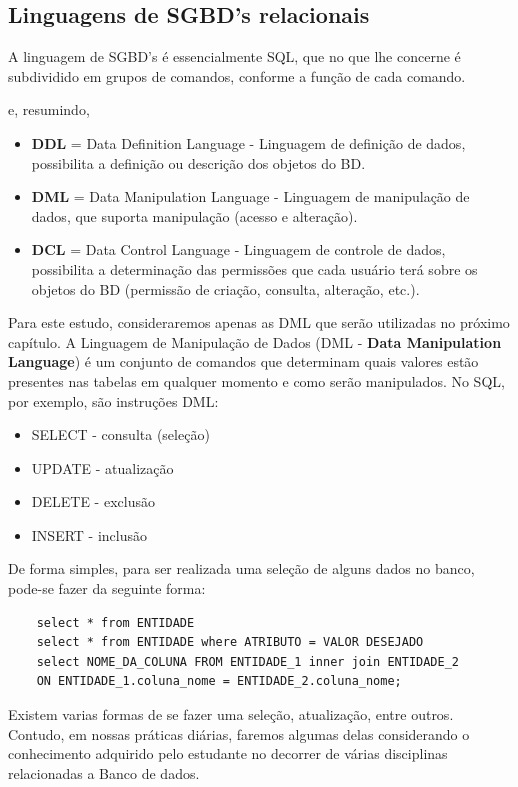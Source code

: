 \subsection{Linguagens de SGBD’s relacionais} 

A linguagem de SGBD's é essencialmente SQL, que no que lhe concerne é subdividido em grupos de comandos, conforme a função de cada comando.

e, resumindo,

\begin{itemize}
	\item \textbf{DDL} = Data Definition Language - Linguagem de definição de dados, possibilita a definição ou descrição dos objetos do BD.
	\item \textbf{DML} = Data Manipulation Language - Linguagem de manipulação de dados, que suporta manipulação (acesso e alteração).
	\item \textbf{DCL} = Data Control Language - Linguagem de controle de dados, possibilita a determinação das permissões que cada usuário terá sobre os objetos do BD (permissão de criação, consulta, alteração, etc.).
\end{itemize}

Para este estudo, consideraremos apenas as DML que serão utilizadas no próximo capítulo. A Linguagem de Manipulação de Dados (DML - \textbf{Data Manipulation Language}) é um conjunto de comandos que determinam quais valores estão presentes nas tabelas em qualquer momento e como serão manipulados. No SQL, por exemplo, são instruções DML: 

\begin{itemize}
	\item SELECT - consulta (seleção) 
	\item UPDATE - atualização
	\item DELETE - exclusão
	\item INSERT - inclusão
\end{itemize}

De forma simples, para ser realizada uma seleção de alguns dados no banco, pode-se fazer da seguinte forma:

\begin{lstlisting}
	select * from ENTIDADE
	select * from ENTIDADE where ATRIBUTO = VALOR DESEJADO
	select NOME_DA_COLUNA FROM ENTIDADE_1 inner join ENTIDADE_2
	ON ENTIDADE_1.coluna_nome = ENTIDADE_2.coluna_nome;
\end{lstlisting}

Existem varias formas de se fazer uma seleção, atualização, entre outros. Contudo, em nossas práticas diárias, faremos algumas delas considerando o conhecimento adquirido pelo estudante no decorrer de várias disciplinas relacionadas a Banco de dados. 


